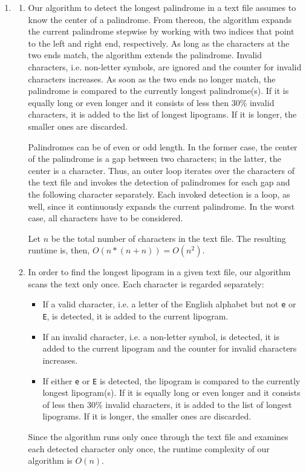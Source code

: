 \documentclass[a4paper,11pt,oneside]{book}
\begin{document}
\begin{enumerate}
	\item	\begin{enumerate}
					\item Our algorithm to detect the longest palindrome in a text file assumes to know the center of a palindrome. From thereon, the algorithm expands the current palindrome stepwise by working with two indices that point to the left and right end, respectively. As long as the characters at the two ends match, the algorithm extends the palindrome. Invalid characters, i.e. non-letter symbols, are ignored and the counter for invalid characters increases. As soon as the two ends no longer match, the palindrome is compared to the currently longest palindrome(s). If it is equally long or even longer and it consists of less then 30\% invalid characters, it is added to the list of longest lipograms. If it is longer, the smaller ones are discarded.
					
					Palindromes can be of even or odd length. In the former case, the center of the palindrome is a gap between two characters; in the latter, the center is a character. Thus, an outer loop iterates over the characters of the text file and invokes the detection of palindromes for each gap and the following character separately. Each invoked detection is a loop, as well, since it continuously expands the current palindrome. In the worst case, all characters have to be considered. 
					
					Let $n$ be the total number of characters in the text file. The resulting runtime is, then, $O(n*(n+n))=O(n^2)$. 
					\item In order to find the longest lipogram in a given text file, our algorithm scans the text only once. Each character is regarded separately: \begin{itemize}
							\item If a valid character, i.e. a letter of the English alphabet but not \texttt{e} or \texttt{E}, is detected, it is added to the current lipogram.
							\item If an invalid character, i.e. a non-letter symbol, is detected, it is added to the current lipogram and the counter for invalid characters increases.
							\item If either \texttt{e} or \texttt{E} is detected, the lipogram is compared to the currently longest lipogram(s). If it is equally long or even longer and it consists of less then 30\% invalid characters, it is added to the list of longest lipograms. If it is longer, the smaller ones are discarded.
						\end{itemize}
						Since the algorithm runs only once through the text file and examines each detected character only once, the runtime complexity of our algorithm is $O(n)$.
				\end{enumerate}
\end{enumerate}
\end{document}
